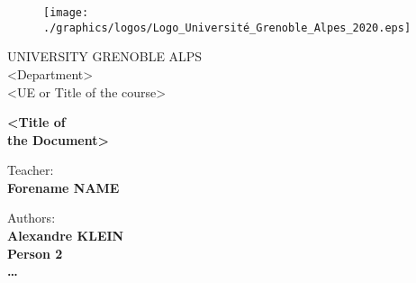 \documentclass[a4paper, twoside]{report}
\begin{document}





\begin{titlepage}
\begin{figure}[!htb]
    \centering
    \texttt{[image: ./graphics/logos/Logo\_Université\_Grenoble\_Alpes\_2020.eps]}
\end{figure}

\begin{center}
    \LARGE{UNIVERSITY GRENOBLE ALPS}
    \vspace{5mm}
    \\ \large{<Department>}
    \vspace{5mm}
    \\ \LARGE{<UE or Title of the course>}
\end{center}

\vspace{15mm}
\begin{center}
    {\LARGE{\bf <Title of\\\vspace{5mm}the Document>}}
\end{center}
\vspace{30mm}

\begin{minipage}[t]{0.47\textwidth}
	{\large{Teacher:}{\normalsize\vspace{3mm}
	\bf\\ \large{Forename NAME \vspace{2mm}\\ }}}
\end{minipage}
\hfill
\begin{minipage}[t]{0.47\textwidth}\raggedleft
	{\large{Authors:}{\normalsize\vspace{3mm}
    \bf\\ \large{Alexandre KLEIN \vspace{2mm}\\ Person 2 \vspace{2mm}\\\ldots }}}
\end{minipage}

\vspace{30mm}
\hrulefill
\\

\end{titlepage}
\end{document}
